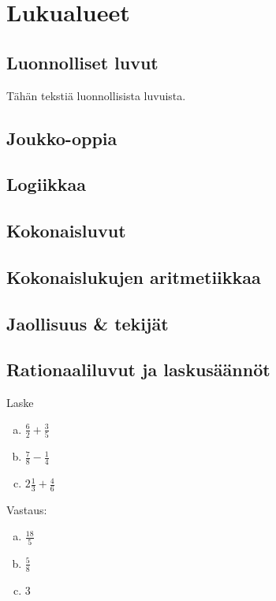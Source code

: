 


\part{Lukualueet}
\chapter{Luonnolliset luvut}

Tähän tekstiä luonnollisista luvuista.

\chapter{Joukko-oppia}
\chapter{Logiikkaa}
\chapter{Kokonaisluvut}
\chapter{Kokonaislukujen aritmetiikkaa}
\chapter{Jaollisuus \& tekijät}
\chapter{Rationaaliluvut ja laskusäännöt}

\begin{tehtava}
Laske %
\begin{enumerate}[(a)]
\item $\frac{6}{2} + \frac{3}{5}$
\item $\frac{7}{8} - \frac{1}{4}$
\item $2 \frac{1}{3} + \frac{4}{6}$
\end{enumerate}
\begin{vastaus}
Vastaus:
\begin{enumerate}[(a)]
\item $\frac{18}{5}$
\item $\frac{5}{8}$
\item $3$
\end{enumerate}
\end{vastaus}
\end{tehtava}

